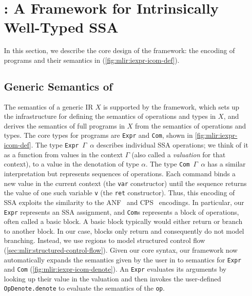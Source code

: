 \section{\texorpdfstring{}{LeanMLIR(X)}: A Framework for Intrinsically Well-Typed SSA}
\label{sec:mlir:framework}

In this section, we describe the core design of the framework: the encoding of programs and their semantics in  (\cref{fig:mlir:iexpr-icom-def}).

\subsection{Generic Semantics of \texorpdfstring{}{LeanMLIR(X)}}

The semantics of a generic IR $X$ is supported by the framework, which sets up the infrastructure for defining the semantics of operations and types in $X$,
and derives the semantics of full programs in $X$ from the semantics of operations and types.
The core types for programs are \texttt{Expr} and \texttt{Com}, shown in \cref{fig:mlir:iexpr-icom-def}.
The type \texttt{Expr~$\Gamma$~$\alpha$} describes individual SSA operations; we think of it as a function from values in the context $\Gamma$ (also called a \emph{valuation} for that context), to a value in the denotation of type $\alpha$.
The type \texttt{Com~$\Gamma$~$\alpha$} has a similar interpretation but represents sequences of operations.
Each command binds a new value in the current context (the \texttt{var} constructor) until the sequence returns the value of one such variable \texttt{v} (the \texttt{ret} constructor).
Thus, this encoding of SSA exploits the similarity to the ANF~\cite{appel1998ssa}
and CPS~\cite{kelsey1995correspondence} encodings.
In particular, our \texttt{Expr} represents an SSA assignment, and \texttt{Com}s represents a block of operations, often called a basic block. A basic block typically would either return or branch to another block. In our case, blocks only return and consequently do not model branching. Instead, we use regions to model structured control flow (\cref{sec:mlir:structured-control-flow}).
Given our core syntax, our framework now automatically expands the semantics given by the user in  to semantics for \texttt{Expr} and \texttt{Com} (\cref{fig:mlir:iexpr-icom-denote}).
An \texttt{Expr} evaluates its arguments by looking up their value in the valuation and then invokes the user-defined \texttt{OpDenote.denote} to evaluate the semantics of the \texttt{op}.

